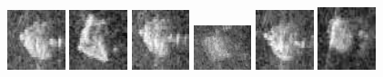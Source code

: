 \begin{figure}
    \includegraphics[width=0.15\textwidth]{chapters/images/dataset/all-class-images/drinkCarton/drinkCarton-338.jpg}
    \includegraphics[width=0.15\textwidth]{chapters/images/dataset/all-class-images/drinkCarton/drinkCarton-153.jpg}
    \includegraphics[width=0.15\textwidth]{chapters/images/dataset/all-class-images/drinkCarton/drinkCarton-324.jpg}
    \includegraphics[width=0.15\textwidth]{chapters/images/dataset/all-class-images/drinkCarton/drinkCarton-76.jpg}
    \includegraphics[width=0.15\textwidth]{chapters/images/dataset/all-class-images/drinkCarton/drinkCarton-256.jpg}
    \includegraphics[width=0.15\textwidth]{chapters/images/dataset/all-class-images/drinkCarton/drinkCarton-8.jpg}
    

\end{figure}
